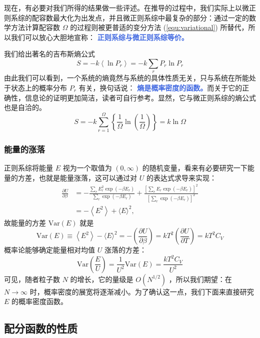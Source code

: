 \documentclass[hyperref,UTF-8]{ctexart}
\newcommand{\0}{\boldsymbol{0}}
\begin{document}
现在，有必要对我们所得的结果做一些评述。在推导的过程中，我们实际上以微正则系综的配容数最大化为出发点，并且微正则系综中最复杂的部分：通过一定的数学方法计算配容数 $\Omega$ 的过程则被更普适的变分方法 (\ref*{equ:variational}) 所替代，所以我们可以放心大胆地宣称： \textcolor{RoyalBlue}{\textbf{\kaishu  正则系综与微正则系综等价。}}

我们给出著名的吉布斯熵公式
\begin{equation}\label{equ:GibbsS}
    S=-k\left\langle\ln P_r\right\rangle=-k \sum_r P_r \ln P_r
\end{equation}
由此我们可以看到，一个系统的熵竟然与系统的具体性质无关，只与系统在所能处于状态上的概率分布 $P_r$ 有关，换句话说： \textcolor{RoyalBlue}{\textbf{\kaishu 熵是概率密度的函数。}}而关于它的正确性，信息论的证明更加简洁，读者可自行参考。显然，它与微正则系综的熵公式也是自洽的。
\[
    S=-k \sum_{r=1}^{\Omega}\left\{\frac{1}{\Omega} \ln \left(\frac{1}{\Omega}\right)\right\}=k \ln \Omega
\]

\subsubsection{能量的涨落}

正则系综将能量 $E$ 视为一个取值为 $(0, \infty)$ 的随机变量，看来有必要研究一下能量的方差，也就是能量涨落，这可以通过对 $U$ 的表达式求导来实现：
\[
    \begin{aligned}
\frac{\partial U}{\partial \beta} & =-\frac{\sum_r E_r^2 \exp \left(-\beta E_r\right)}{\sum_r \exp \left(-\beta E_r\right)}+\frac{\left[\sum_r E_r \exp \left(-\beta E_r\right)\right]^2}{\left[\sum_r \exp \left(-\beta E_r\right)\right]^2} \\
& =-\left\langle E^2\right\rangle+\langle E\rangle^2,
\end{aligned}
\]
故能量的方差 $\text{Var}(E)$ 就是
\begin{equation}\label{equ:label}
    \text{Var}(E) \equiv\left\langle E^2\right\rangle-\langle E\rangle^2=-\left(\frac{\partial U}{\partial \beta}\right)=k T^2\left(\frac{\partial U}{\partial T}\right)=k T^2 C_V
\end{equation}
概率论能够确定能量相对均值 $U$ 涨落的方差：
\[
    \text{Var}\left(\frac{E}{U} \right) = \frac{1}{U^2} \text{Var}(E) = \frac{k T^2 C_V}{U^2} 
\]
可见，随者粒子数 $N$ 的增长，它的量级是 $O(N^{1/2})$ ，所以我们期望：在 $N \rightarrow \infty$ 时，概率密度的展宽将逐渐减小。为了确认这一点，我们下面来直接研究 $E$ 的概率密度函数。

\subsection{配分函数的性质}
\end{document}
